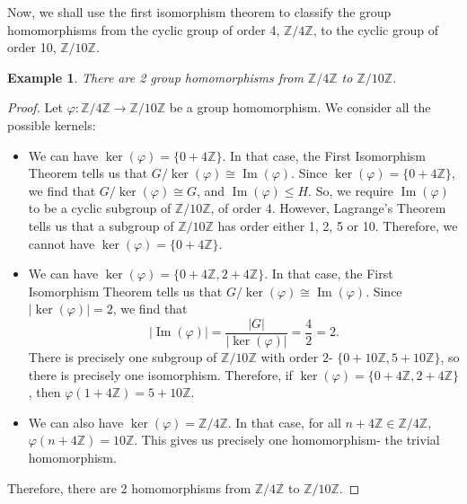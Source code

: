 \documentclass[a4paper, openany]{memoir}
\theoremstyle{definition}
\theoremstyle{plain}
\newtheorem{example}[definition]{Example}
\begin{document}
Now, we shall use the first isomorphism theorem to classify the group homomorphisms from the cyclic group of order 4, $\mathbb{Z}/4 \mathbb{Z}$, to the cyclic group of order 10, $\mathbb{Z}/10 \mathbb{Z}$.
\begin{example}
There are 2 group homomorphisms from $\mathbb{Z}/4 \mathbb{Z}$ to $\mathbb{Z}/10 \mathbb{Z}$.
\end{example}
\begin{proof}
Let $\varphi: \mathbb{Z}/4 \mathbb{Z} \to \mathbb{Z}/10 \mathbb{Z}$ be a group homomorphism. We consider all the possible kernels:
\begin{itemize}
    \item We can have $\ker (\varphi) = \{0 + 4\mathbb{Z}\}$. In that case, the First Isomorphism Theorem tells us that $G/\ker (\varphi) \cong \operatorname{Im}(\varphi)$. Since $\ker (\varphi) = \{0 + 4\mathbb{Z}\}$, we find that $G/\ker (\varphi) \cong G$, and $\operatorname{Im}(\varphi) \leqslant H$. So, we require $\operatorname{Im}(\varphi)$ to be a cyclic subgroup of $\mathbb{Z}/10 \mathbb{Z}$, of order 4. However, Lagrange's Theorem tells us that a subgroup of $\mathbb{Z}/10 \mathbb{Z}$ has order either 1, 2, 5 or 10. Therefore, we cannot have $\ker (\varphi) = \{0 + 4\mathbb{Z}\}$.
    
    \item We can have $\ker (\varphi) = \{0 + 4\mathbb{Z}, 2 + 4\mathbb{Z}\}$. In that case, the First Isomorphism Theorem tells us that $G/\ker (\varphi) \cong \operatorname{Im}(\varphi)$. Since $|\ker (\varphi)| = 2$, we find that 
    \[|\operatorname{Im}(\varphi)| = \frac{|G|}{|\ker (\varphi)|} = \frac{4}{2} = 2.\]
    There is precisely one subgroup of $\mathbb{Z}/10 \mathbb{Z}$ with order $2$- $\{0 + 10\mathbb{Z}, 5 + 10\mathbb{Z}\}$, so there is precisely one isomorphism. Therefore, if $\ker (\varphi) = \{0 + 4\mathbb{Z}, 2 + 4\mathbb{Z}\}$, then $\varphi(1 + 4\mathbb{Z}) = 5 + 10\mathbb{Z}$.
    
    \item We can also have $\ker (\varphi) = \mathbb{Z}/4 \mathbb{Z}$. In that case, for all $n + 4\mathbb{Z} \in \mathbb{Z}/4 \mathbb{Z}$, $\varphi(n + 4\mathbb{Z}) = 10 \mathbb{Z}$. This gives us precisely one homomorphism- the trivial homomorphism.
\end{itemize}
Therefore, there are 2 homomorphisms from $\mathbb{Z}/4 \mathbb{Z}$ to $\mathbb{Z}/10 \mathbb{Z}$.
\end{proof}
\end{document}
